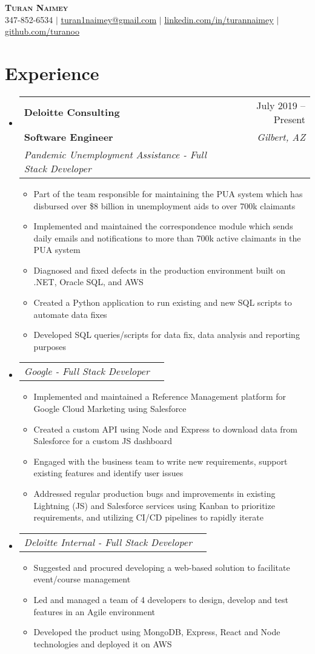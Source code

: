 \documentclass[letterpaper,11pt]{article}
\makeatletter
\newcommand{\resumeItem}[1]{
  \item\small{
    {#1 \vspace{-2pt}}
  }
}
\newcommand{\resumeSubheading}[5]{
  \vspace{-2pt}\item
    \begin{tabular*}{0.97\textwidth}[t]{l@{\extracolsep{\fill}}r}
      \textbf{#1} & #2 \\
      \textbf{\small#3} & \textit{\small #4} \\
      \textit{\small#5} \\
    \end{tabular*}\vspace{-7pt}
}
\newcommand{\resumeSubSubheading}[2]{
    \item
    \begin{tabular*}{0.97\textwidth}{l@{\extracolsep{\fill}}r}
      \textit{\small#1} & \textit{\small #2} \\
    \end{tabular*}\vspace{-7pt}
}
\newcommand{\resumeSubHeadingListStart}{\begin{itemize}[leftmargin=0.15in, label={}]}
\newcommand{\resumeSubHeadingListEnd}{\end{itemize}}
\newcommand{\resumeItemListStart}{\begin{itemize}}
\newcommand{\resumeItemListEnd}{\end{itemize}\vspace{-5pt}}
\makeatother
\begin{document}
\begin{center}
 \textbf{\Huge \scshape Turan Naimey} \\ \vspace{1pt}
 \small 347-852-6534 $|$ \href{mailto:turan1naimey@gmail.com}{\underline{turan1naimey@gmail.com}} $|$
 \href{https://linkedin.com/in/turannaimey}{\underline{linkedin.com/in/turannaimey}} $|$
 \href{https://github.com/turanoo}{\underline{github.com/turanoo}}
\end{center}

\section{Experience}
\resumeSubHeadingListStart
\resumeSubheading
{Deloitte Consulting}{July 2019 -- Present}
{Software Engineer}{Gilbert, AZ}
{Pandemic Unemployment Assistance - Full Stack Developer}
\resumeItemListStart
\resumeItem{Part of the team responsible for maintaining the PUA system which has disbursed over \$8 billion in unemployment aids to over 700k claimants}
\resumeItem{Implemented and maintained the correspondence module which sends daily emails and notifications to more than 700k active claimants in the PUA system}
\resumeItem{Diagnosed and fixed defects in the production environment built on .NET, Oracle SQL, and AWS}
\resumeItem{Created a Python application to run existing and new SQL scripts to automate data fixes}
\resumeItem{Developed SQL queries/scripts for data fix, data analysis and reporting purposes}
\resumeItemListEnd

\resumeSubSubheading
{Google - Full Stack Developer}{}
\resumeItemListStart
\resumeItem{Implemented and maintained a Reference Management platform for Google Cloud Marketing using Salesforce}
\resumeItem{Created a custom API using Node and Express to download data from Salesforce for a custom JS dashboard}
\resumeItem{Engaged with the business team to write new requirements, support existing features and identify user issues}
\resumeItem{Addressed regular production bugs and improvements in existing Lightning (JS) and Salesforce services using Kanban to prioritize requirements, and utilizing CI/CD pipelines to rapidly iterate}
\resumeItemListEnd

\resumeSubSubheading
{Deloitte Internal - Full Stack Developer}{}
\resumeItemListStart
\resumeItem {Suggested and procured developing a web-based solution to facilitate event/course management}
\resumeItem{Led and managed a team of 4 developers to design, develop and test features in an Agile environment}
\resumeItem{Developed the product using MongoDB, Express, React and Node technologies and deployed it on AWS}
\resumeItemListEnd
\resumeSubHeadingListEnd
\end{document}
